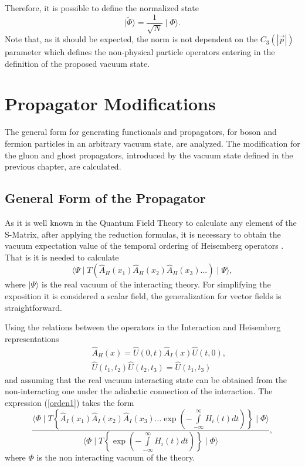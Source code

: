 \documentclass[12pt,letterpaper]{report}
\begin{document}
Therefore, it is possible to define the normalized state
\begin{equation}
\mid \widetilde{\Phi }\rangle =\frac 1{\sqrt{N}}\mid \Phi \rangle.
\end{equation}
Note that, as it should be expected, the norm is not dependent on
the $ C_3\left(\left| \vec{p}\right| \right) $ parameter which
defines the non-physical particle operators entering in the
definition of the proposed vacuum state.

\chapter{Propagator Modifications}

The general form for generating functionals and propagators, for
boson and fermion particles in an arbitrary vacuum state, are
analyzed. The modification for the gluon and ghost propagators,
introduced by the vacuum state defined in the previous chapter,
are calculated.

\section{General Form of the Propagator}

As it is well known in the Quantum Field Theory to calculate any
element of the S-Matrix, after applying the reduction formulas, it
is necessary to obtain the vacuum expectation value of the
temporal ordering of Heisemberg operators \cite{Gasiorowicz}. That
is it is needed to calculate
\begin{equation}
\langle \Psi \mid T\left(\hat{A}_H\left(x_1\right) \hat{A}_H\left(
x_2\right) \hat{A}_H\left(x_3\right)...\right) \mid \Psi \rangle,
\label{orden1}
\end{equation}
where $\mid \Psi \rangle $ is the real vacuum of the interacting
theory. For simplifying the exposition it is considered a scalar
field, the generalization for vector fields is straightforward.

Using the relations between the operators in the Interaction and
Heisemberg representations
\begin{eqnarray*}
&&\hat{A}_H\left(x\right) =\hat{U}\left(0,t\right) \hat{A}_I\left(
x\right) \hat{U}\left(t,0\right), \\ &&\hat{U}\left(
t_1,t_2\right) \hat{U}\left(t_2,t_3\right) =\hat{U}\left(
t_1,t_3\right)
\end{eqnarray*}
and assuming that the real vacuum interacting state can be
obtained from the non-interacting one under the adiabatic
connection of the interaction. The expression (\ref{orden1}) takes
the form \cite{Gasiorowicz}
\begin{equation}
\frac{\langle \Phi \mid T\left\{ \hat{A}_I\left(x_1\right)
\hat{A}_I\left(x_2\right) \hat{A}_I\left(x_3\right)...\exp \left(
-\int\limits_{-\infty }^\infty H_i\left(t\right) dt\right)
\right\} \mid \Phi \rangle }{\langle \Phi \mid T\left\{ \exp
\left(-\int\limits_{-\infty }^\infty H_i\left(t\right) dt\right)
\right\} \mid \Phi \rangle }, \label{orden2}
\end{equation}
where $\Phi $ is the non interacting vacuum of the theory.
\end{document}

